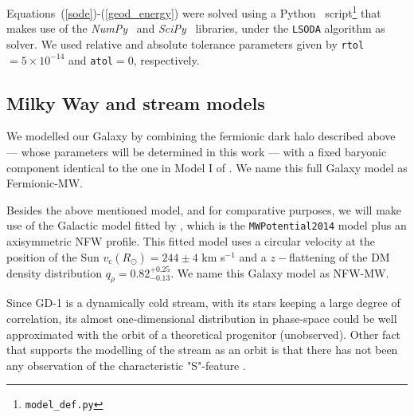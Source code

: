 \documentclass[twocolumn]{aa}
\begin{document}
Equations~(\ref{sode})-(\ref{geod_energy}) were solved using
a {\sc Python}~\citep{van1995python} script\footnote{\texttt{model\_def.py}}
that makes use of the {\it NumPy}~\citep{2020SciPy-NMeth} and {\it SciPy}~\citep{harris2020array} libraries, under the \texttt{LSODA} algorithm as solver.  We used relative and absolute tolerance parameters given by \texttt{rtol}$=5\times10^{-14}$ and \texttt{atol}$=0$, respectively.



\subsection{Milky Way and stream models}
\label{sec:MW_stream_models}

We modelled our Galaxy by combining the fermionic dark halo described above --- whose parameters will be determined in this work --- with a fixed baryonic component identical to the one in Model I of \citet{2017A&A...598A..66P}. We name this full Galaxy model as Fermionic-MW.

Besides the above mentioned model, and for comparative purposes, we will make use of the Galactic model fitted by \citet{2019MNRAS.486.2995M}, which is the {\texttt{MWPotential2014}} model plus an axisymmetric NFW profile. This fitted model uses a circular velocity at the position of the Sun $v_\mathrm{c}(R_\odot)=244 \pm 4$ km s$^{-1}$ and a $z-$flattening of the DM density distribution  $q_\rho=0.82^{+0.25}_{-0.13}$. We name this Galaxy model as NFW-MW.

Since GD-1 is a dynamically cold stream, with its stars keeping a large degree of correlation, its almost one-dimensional distribution in phase-space could be well approximated with the orbit of a theoretical progenitor (unobserved). Other fact that supports the modelling of the stream as an orbit is that there has not been any observation of the characteristic "S"-feature \citep{2019MNRAS.486.2995M,10.1093/mnras/sty677,10.1093/mnras/sty1338,Price-Whelan_2018}.
\end{document}
